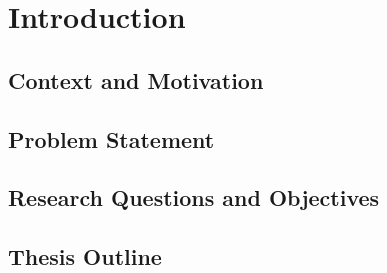 
\chapter{Introduction}\label{ch:intro}

\section{Context and Motivation}

\section{Problem Statement}

\section{Research Questions and Objectives}

\section{Thesis Outline}
